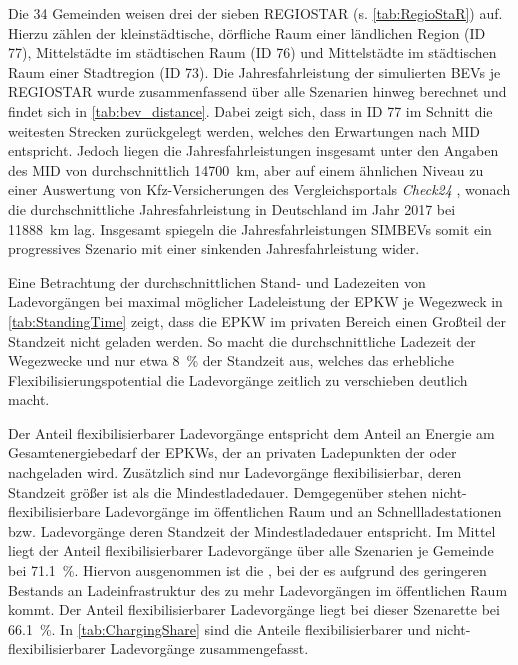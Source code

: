 Die \num{34} Gemeinden weisen drei der sieben \gls{REGIOSTAR} (s. \autoref{tab:RegioStaR}) auf.
Hierzu zählen der kleinstädtische, dörfliche Raum einer ländlichen Region (\gls{ID} \num{77}), Mittelstädte im städtischen Raum (\gls{ID} \num{76}) und Mittelstädte im städtischen Raum einer Stadtregion (\gls{ID} \num{73}).
Die Jahresfahrleistung der simulierten \glspl{BEV} je \gls{REGIOSTAR} wurde zusammenfassend über alle Szenarien hinweg berechnet und findet sich in \autoref{tab:bev_distance}.
Dabei zeigt sich, dass in \gls{ID} \num{77} im Schnitt die weitesten Strecken zurückgelegt werden, welches den Erwartungen nach \gls{MID} \cite{Nobis2019} entspricht.
Jedoch liegen die Jahresfahrleistungen insgesamt unter den Angaben des \gls{MID} von durchschnittlich \SI{14700}{\km}, aber auf einem ähnlichen Niveau zu einer Auswertung von Kfz-Versicherungen des Vergleichsportals \textit{Check24} \cite{CHECK24GmbH2018}, wonach die durchschnittliche Jahresfahrleistung in Deutschland im Jahr \num{2017} bei \SI{11888}{\km} lag.
Insgesamt spiegeln die Jahresfahrleistungen \glspl{SIMBEV} somit ein progressives Szenario mit einer sinkenden Jahresfahrleistung wider.




Eine Betrachtung der durchschnittlichen Stand- und Ladezeiten von Ladevorgängen bei maximal möglicher Ladeleistung der \gls{EPKW} je Wegezweck in \autoref{tab:StandingTime} zeigt, dass die \gls{EPKW} im privaten Bereich einen Großteil der Standzeit nicht geladen werden.
So macht die durchschnittliche Ladezeit der Wegezwecke \nH und \Arbeit nur etwa \SI{8}{\percent} der Standzeit aus, welches das erhebliche Flexibilisierungspotential die Ladevorgänge zeitlich zu verschieben deutlich macht.



Der Anteil flexibilisierbarer Ladevorgänge entspricht dem Anteil an Energie am Gesamtenergiebedarf der \glspl{EPKW}, der an privaten Ladepunkten der \UCs \zH oder \Firmeparkplatz nachgeladen wird.
Zusätzlich sind nur Ladevorgänge flexibilisierbar, deren Standzeit größer ist als die Mindestladedauer.
Demgegenüber stehen nicht-flexibilisierbare Ladevorgänge im öffentlichen Raum und an Schnellladestationen bzw. Ladevorgänge deren Standzeit der Mindestladedauer entspricht.
Im Mittel liegt der Anteil flexibilisierbarer Ladevorgänge über alle Szenarien je Gemeinde bei \SI{71.1}{\percent}.
Hiervon ausgenommen ist die \SzeFirmenparkplatzdot, bei der es aufgrund des geringeren Bestands an Ladeinfrastruktur des \UC \Firmeparkplatz zu mehr Ladevorgängen im öffentlichen Raum kommt.
Der Anteil flexibilisierbarer Ladevorgänge liegt bei dieser Szenarette bei \SI{66.1}{\percent}.
In \autoref{tab:ChargingShare} sind die Anteile flexibilisierbarer und nicht-flexibilisierbarer Ladevorgänge zusammengefasst.

